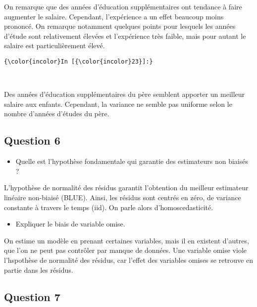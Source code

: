 \documentclass[11pt]{article}
\providecommand{\tightlist}{%
      \setlength{\itemsep}{0pt}\setlength{\parskip}{0pt}}
\begin{document}
    On remarque que des années d'éducation supplémentaires ont tendance à
faire augmenter le salaire. Cependant, l'expérience a un effet beaucoup
moins prononcé. On remarque notamment quelques points pour lesquels les
années d'étude sont relativement élevées et l'expérience très faible,
mais pour autant le salaire est particulièrement élevé.

    \begin{Verbatim}[commandchars=\\\{\}]
{\color{incolor}In [{\color{incolor}23}]:} 
\end{Verbatim}


    \begin{center}
    \end{center}
    { \hspace*{\fill} \\}
    
    Des années d'éducation supplémentaires du père semblent apporter un
meilleur salaire aux enfants. Cependant, la variance ne semble pas
uniforme selon le nombre d'années d'études du père.

    \subsection{Question 6}\label{question-6}

\begin{itemize}
\tightlist
\item
  Quelle est l'hypothèse fondamentale qui garantie des estimateurs non
  biaisés ? 
\end{itemize}

L'hypothèse de normalité des résidus garantit l'obtention du meilleur
estimateur linéaire non-biaisé (BLUE). Ainsi, les résidus sont centrés
en zéro, de variance constante à travers le temps (iid). On parle alors
d'homoscedasticité.

\begin{itemize}
\tightlist
\item
  Expliquer le biais de variable omise.
\end{itemize}

On estime un modèle en prenant certaines variables, mais il en existent
d'autres, que l'on ne peut pas contrôler par manque de données. Une
variable omise viole l'hspothèse de normalité des résidus, car l'effet
des variables omises se retrouve en partie dans les résidus.

    \subsection{Question 7}\label{question-7}
\end{document}
